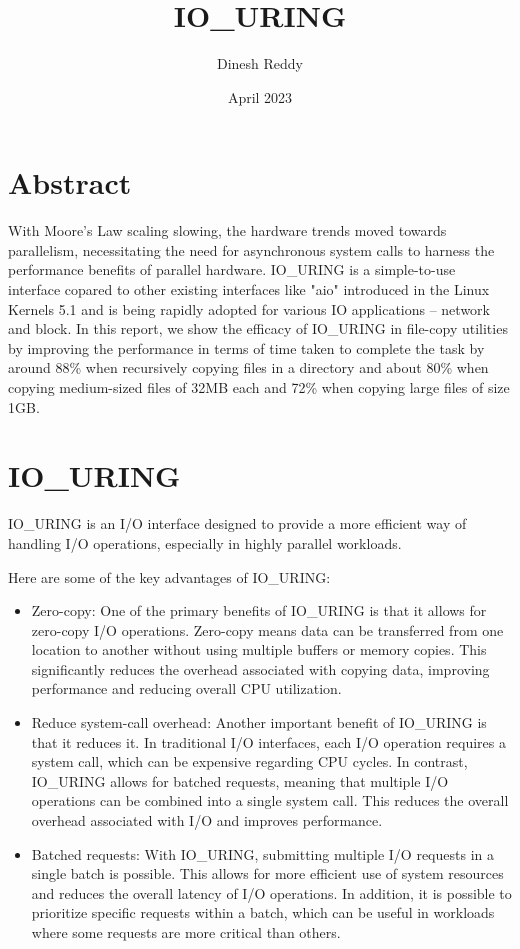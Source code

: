 \documentclass{article}
\title{IO\_URING}
\author{Dinesh Reddy}
\date{April 2023}
\begin{document}
\maketitle
\section{Abstract}
With Moore's Law scaling slowing, the hardware trends moved towards parallelism, necessitating the need for asynchronous 
system calls to harness the performance benefits of parallel hardware. IO\_URING is a simple-to-use 
interface copared to other existing interfaces like "aio" introduced in the Linux Kernels 5.1 and 
is being rapidly adopted for various IO applications -- network and block. In this report, 
we show the efficacy of IO\_URING in file-copy utilities by improving the performance in terms of time taken to complete the 
task by around 88\% when recursively copying files in a directory and about 80\% when copying medium-sized files of 32MB each 
and 72\% when copying large files of size 1GB.

\section{IO\_URING}

IO\_URING is an I/O interface designed to provide a more efficient way of handling I/O operations, especially in highly 
parallel workloads.

Here are some of the key advantages of IO\_URING:
\begin{itemize}
\item Zero-copy: One of the primary benefits of IO\_URING is that it allows for zero-copy I/O operations. 
Zero-copy means data can be transferred from one location to another without using multiple buffers or memory copies. 
This significantly reduces the overhead associated with copying data, improving performance and reducing overall CPU utilization.
\item Reduce system-call overhead: Another important benefit of IO\_URING is that it reduces it. In traditional I/O interfaces, 
each I/O operation requires a system call, which can be expensive regarding CPU cycles. In contrast, IO\_URING allows for batched 
requests, meaning that multiple I/O operations can be combined into a single system call. This reduces the overall overhead 
associated with I/O and improves performance.
\item Batched requests: With IO\_URING, submitting multiple I/O requests in a single batch is possible. This allows for more efficient 
use of system resources and reduces the overall latency of I/O operations. In addition, it is possible to prioritize specific 
requests within a batch, which can be useful in workloads where some requests are more critical than others.
\end{itemize}
\end{document}
